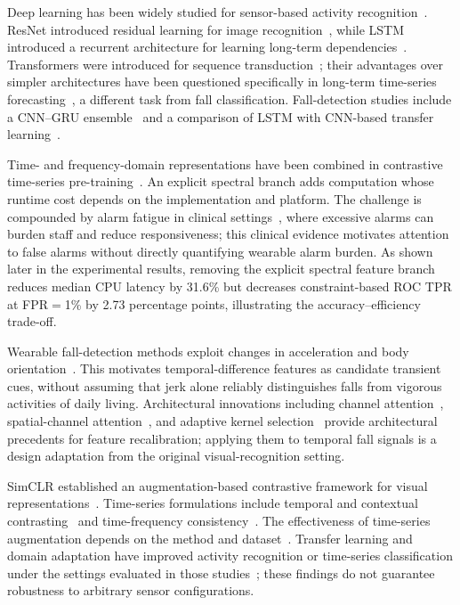\documentclass[jec]{acnsart}
\begin{document}
Deep learning has been widely studied for sensor-based activity recognition~\cite{wang2019deep}. ResNet introduced residual learning for image recognition~\cite{he2016resnet}, while LSTM introduced a recurrent architecture for learning long-term dependencies~\cite{hochreiter1997lstm}. Transformers were introduced for sequence transduction~\cite{Vaswani2017Attention}; their advantages over simpler architectures have been questioned specifically in long-term time-series forecasting~\cite{Zeng2023TransformersEffective}, a different task from fall classification. Fall-detection studies include a CNN--GRU ensemble~\cite{Liu2023FallEnsemble} and a comparison of LSTM with CNN-based transfer learning~\cite{Butt2022FallLSTM}.

Time- and frequency-domain representations have been combined in contrastive time-series pre-training~\cite{Zhang2022TFC}. An explicit spectral branch adds computation whose runtime cost depends on the implementation and platform. The challenge is compounded by alarm fatigue in clinical settings~\cite{Cvach2012AlarmFatigue}, where excessive alarms can burden staff and reduce responsiveness; this clinical evidence motivates attention to false alarms without directly quantifying wearable alarm burden. As shown later in the experimental results, removing the explicit spectral feature branch reduces median CPU latency by 31.6\% but decreases constraint-based ROC TPR at FPR${=}$1\% by 2.73 percentage points, illustrating the accuracy--efficiency trade-off.

Wearable fall-detection methods exploit changes in acceleration and body orientation~\cite{Wu2015Wearable}. This motivates temporal-difference features as candidate transient cues, without assuming that jerk alone reliably distinguishes falls from vigorous activities of daily living. Architectural innovations including channel attention~\cite{hu2018squeeze}, spatial-channel attention~\cite{woo2018cbam}, and adaptive kernel selection~\cite{li2019sknet} provide architectural precedents for feature recalibration; applying them to temporal fall signals is a design adaptation from the original visual-recognition setting.

SimCLR established an augmentation-based contrastive framework for visual representations~\cite{chen2020simclr}. Time-series formulations include temporal and contextual contrasting~\cite{Eldele2021TSTCC} and time-frequency consistency~\cite{Zhang2022TFC}. The effectiveness of time-series augmentation depends on the method and dataset~\cite{Iwana2021DataAugmentation}. Transfer learning and domain adaptation have improved activity recognition or time-series classification under the settings evaluated in those studies~\cite{Jia2024TransferLearningHAR,Wu2024DomainAdaptationContrastive}; these findings do not guarantee robustness to arbitrary sensor configurations.
\end{document}
